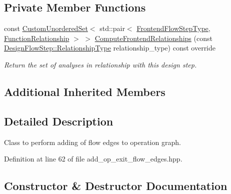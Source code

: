 \subsection*{Private Member Functions}
\begin{DoxyCompactItemize}
\item 
const \hyperlink{classCustomUnorderedSet}{Custom\+Unordered\+Set}$<$ std\+::pair$<$ \hyperlink{frontend__flow__step_8hpp_afeb3716c693d2b2e4ed3e6d04c3b63bb}{Frontend\+Flow\+Step\+Type}, \hyperlink{classFrontendFlowStep_af7cf30f2023e5b99e637dc2058289ab0}{Function\+Relationship} $>$ $>$ \hyperlink{classAddOpExitFlowEdges_aefe934ca0a4f3717e458d9d1e3ddf5ed}{Compute\+Frontend\+Relationships} (const \hyperlink{classDesignFlowStep_a723a3baf19ff2ceb77bc13e099d0b1b7}{Design\+Flow\+Step\+::\+Relationship\+Type} relationship\+\_\+type) const override
\begin{DoxyCompactList}\small\item\em Return the set of analyses in relationship with this design step. \end{DoxyCompactList}\end{DoxyCompactItemize}
\subsection*{Additional Inherited Members}


\subsection{Detailed Description}
Class to perform adding of flow edges to operation graph. 

Definition at line 62 of file add\+\_\+op\+\_\+exit\+\_\+flow\+\_\+edges.\+hpp.



\subsection{Constructor \& Destructor Documentation}
\mbox{\label{classAddOpExitFlowEdges_a2d7887a62f52690db79ff3a7cc402be1}} 
